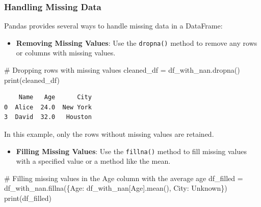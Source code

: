 \documentclass[
  letterpaper,
  DIV=11,
  numbers=noendperiod]{scrreprt}
\newenvironment{Shaded}{\begin{snugshade}}{\end{snugshade}}
\newcommand{\BuiltInTok}[1]{\textcolor[rgb]{0.00,0.23,0.31}{#1}}
\newcommand{\CommentTok}[1]{\textcolor[rgb]{0.37,0.37,0.37}{#1}}
\newcommand{\NormalTok}[1]{\textcolor[rgb]{0.00,0.23,0.31}{#1}}
\newcommand{\OperatorTok}[1]{\textcolor[rgb]{0.37,0.37,0.37}{#1}}
\newcommand{\StringTok}[1]{\textcolor[rgb]{0.13,0.47,0.30}{#1}}
\providecommand{\tightlist}{%
  \setlength{\itemsep}{0pt}\setlength{\parskip}{0pt}}\usepackage{longtable,booktabs,array}
\begin{document}
\hypertarget{handling-missing-data-1}{%
\subsubsection{Handling Missing Data}\label{handling-missing-data-1}}

Pandas provides several ways to handle missing data in a DataFrame:

\begin{itemize}
\tightlist
\item
  \textbf{Removing Missing Values}: Use the \texttt{dropna()} method to
  remove any rows or columns with missing values.
\end{itemize}

\begin{Shaded}
\begin{Highlighting}[]
\CommentTok{\# Dropping rows with missing values}
\NormalTok{cleaned\_df }\OperatorTok{=}\NormalTok{ df\_with\_nan.dropna()}
\BuiltInTok{print}\NormalTok{(cleaned\_df)}
\end{Highlighting}
\end{Shaded}

\begin{verbatim}
    Name   Age      City
0  Alice  24.0  New York
3  David  32.0   Houston
\end{verbatim}

In this example, only the rows without missing values are retained.

\begin{itemize}
\tightlist
\item
  \textbf{Filling Missing Values}: Use the \texttt{fillna()} method to
  fill missing values with a specified value or a method like the mean.
\end{itemize}

\begin{Shaded}
\begin{Highlighting}[]
\CommentTok{\# Filling missing values in the Age column with the average age}
\NormalTok{df\_filled }\OperatorTok{=}\NormalTok{ df\_with\_nan.fillna(\{}\StringTok{\textquotesingle{}Age\textquotesingle{}}\NormalTok{: df\_with\_nan[}\StringTok{\textquotesingle{}Age\textquotesingle{}}\NormalTok{].mean(), }\StringTok{\textquotesingle{}City\textquotesingle{}}\NormalTok{: }\StringTok{\textquotesingle{}Unknown\textquotesingle{}}\NormalTok{\})}
\BuiltInTok{print}\NormalTok{(df\_filled)}
\end{Highlighting}
\end{Shaded}
\end{document}
